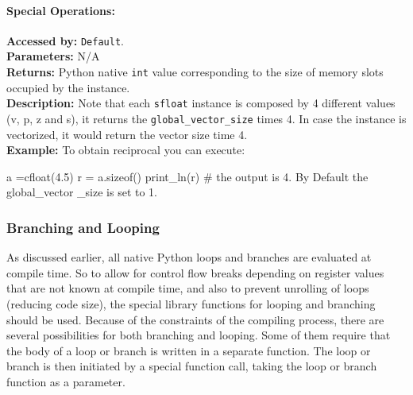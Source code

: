 \paragraph{Special Operations:}
                        \textbf{Accessed by:} \verb|Default|. \\
                        \textbf{Parameters:} N/A \\
                        \textbf{Returns:}
                                 Python native \verb|int| value corresponding to the size of memory slots occupied by the instance. \\
                        \textbf{Description:}
                                Note that each \verb|sfloat| instance is composed by 4 
                                different values (v, p, z and s), 
                                it returns the \verb|global_vector_size| times 4. 
                                In case the instance is vectorized, 
                                it would return the vector size time 4.\\
                \textbf{Example:}
                    To obtain reciprocal you can execute:
                        \begin{mylisting}
                                a =cfloat(4.5)             
                                r = a.sizeof()
                                print_ln(r)  # the output is 4. By Default the global_vector
                                _size is set to 1.
                        \end{mylisting}

\subsubsection{Branching and Looping}
As discussed earlier, all native Python loops and branches are evaluated at
compile time. So to allow for control flow breaks depending on register values
that are not known at compile time, and also to prevent unrolling of loops
(reducing code size), the special
library functions for looping and branching should be used.
Because of the constraints of the compiling process, there are several
possibilities for both branching and looping.
Some of them require that the body of a loop or branch is written
in a separate function. The loop or branch is then initiated by a special
function call, taking the loop or branch function as a parameter.


